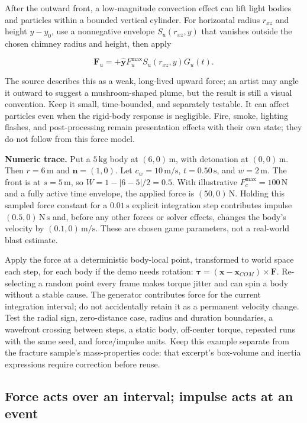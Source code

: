 After the outward front, a low-magnitude convection effect can lift light bodies and particles within a bounded vertical cylinder. For horizontal radius \(r_{xz}\) and height \(y-y_0\), use a nonnegative envelope \(S_u(r_{xz},y)\) that vanishes outside the chosen chimney radius and height, then apply

\[
\mathbf F_u=+\hat{\mathbf y}F_u^{\max}S_u(r_{xz},y)G_u(t).
\]

The source describes this as a weak, long-lived upward force; an artist may angle it outward to suggest a mushroom-shaped plume, but the result is still a visual convention. Keep it small, time-bounded, and separately testable. It can affect particles even when the rigid-body response is negligible. Fire, smoke, lighting flashes, and post-processing remain presentation effects with their own state; they do not follow from this force model.

\textbf{Numeric trace.} Put a \(5\,\mathrm{kg}\) body at \((6,0)\,\mathrm m\), with detonation at \((0,0)\,\mathrm m\). Then \(r=6\,\mathrm m\) and \(\mathbf n=(1,0)\). Let \(c_w=10\,\mathrm{m/s}\), \(t=0.50\,\mathrm s\), and \(w=2\,\mathrm m\). The front is at \(s=5\,\mathrm m\), so \(W=1-|6-5|/2=0.5\). With illustrative \(F_c^{\max}=100\,\mathrm N\) and a fully active time envelope, the applied force is \((50,0)\,\mathrm N\). Holding this sampled force constant for a \(0.01\,\mathrm s\) explicit integration step contributes impulse \((0.5,0)\,\mathrm{N\,s}\) and, before any other forces or solver effects, changes the body's velocity by \((0.1,0)\,\mathrm{m/s}\). These are chosen game parameters, not a real-world blast estimate.

Apply the force at a deterministic body-local point, transformed to world space each step, for each body if the demo needs rotation: \(\boldsymbol\tau=(\mathbf{x}-\mathbf{x}_{COM})\times\mathbf F\). Re-selecting a random point every frame makes torque jitter and can spin a body without a stable cause. The generator contributes force for the current integration interval; do not accidentally retain it as a permanent velocity change. Test the radial sign, zero-distance case, radius and duration boundaries, a wavefront crossing between steps, a static body, off-center torque, repeated runs with the same seed, and force/impulse units. Keep this example separate from the fracture sample's mass-properties code: that excerpt's box-volume and inertia expressions require correction before reuse.

\subsection{Force acts over an interval; impulse acts at an event}\label{06-engine-ii-ch034-force-acts-over-an-interval-impulse-acts-at-an-event}

